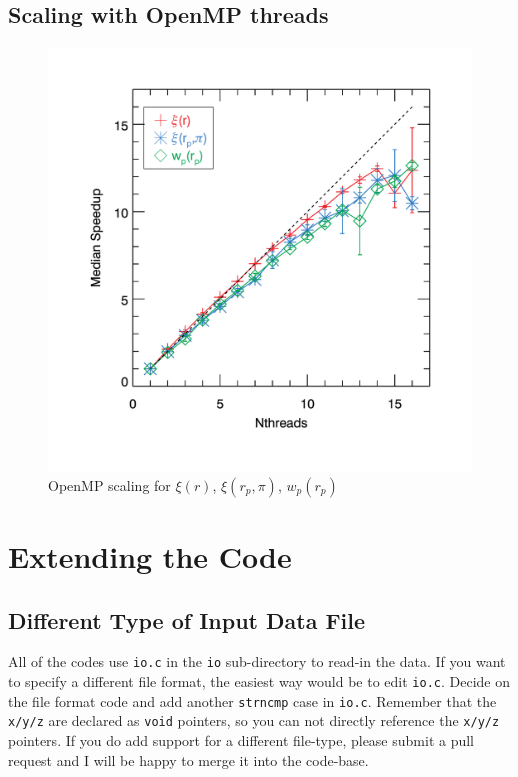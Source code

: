 \documentclass[12pt,titlepage,justified]{article}
\let\stdsection\section
\newcommand{\xir}{\ensuremath{{\xi(r)}}\xspace}
\newcommand{\wprp}{\ensuremath{{w_p(r_p)}}\xspace}
\newcommand{\xirppi}{\ensuremath{{\xi(r_p,\pi)}}\xspace}
\begin{document}
\subsection{Scaling with OpenMP threads}
\begin{figure}[htbp]
\includegraphics[clip=true,width=\linewidth]{timings_Mr19_openmp}%
\caption{OpenMP scaling for \xir, \xirppi, \wprp }
\label{fig:scaling_openmp}
\end{figure}

\clearpage
\stdsection{Extending the Code}
\subsection{Different Type of Input Data File}
All of the codes use \texttt{io.c} in the \texttt{io} sub-directory to read-in the data. If you want to specify a different file format, the easiest way would be to edit 
\texttt{io.c}. Decide on the file format code and add another \texttt{strncmp} case in \texttt{io.c}. Remember that the \texttt{x/y/z} are declared as \texttt{void} pointers, 
so you can not directly reference the \texttt{x/y/z} pointers. If you do add support for a different file-type, please submit a pull request and I will be happy to merge it into the 
code-base. 
\end{document}
